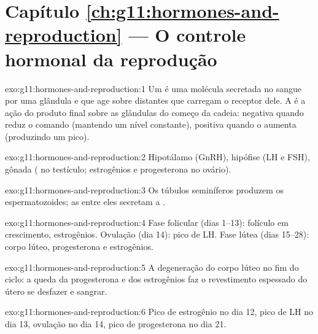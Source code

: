 \section*{Capítulo \ref{ch:g11:hormones-and-reproduction} --- O controle hormonal da reprodução}

\begin{solution}{exo:g11:hormones-and-reproduction:1}
Um  é uma molécula secretada no sangue por uma glândula e que
age sobre  distantes que carregam o receptor dele. A
 é a ação do produto final sobre as glândulas do começo
da cadeia: negativa quando reduz o comando (mantendo um nível
constante), positiva quando o aumenta (produzindo um pico).
\end{solution}

\begin{solution}{exo:g11:hormones-and-reproduction:2}
Hipotálamo (GnRH), hipófise (LH e FSH), gônada ( no
testículo; estrogênios e progesterona no ovário).
\end{solution}

\begin{solution}{exo:g11:hormones-and-reproduction:3}
Os túbulos seminíferos produzem os espermatozoides; as  entre
eles secretam a .
\end{solution}

\begin{solution}{exo:g11:hormones-and-reproduction:4}
Fase folicular (dias 1--13): folículo em crescimento, estrogênios.
Ovulação (dia 14): pico de LH. Fase lútea (dias 15--28): corpo lúteo,
progesterona e estrogênios.
\end{solution}

\begin{solution}{exo:g11:hormones-and-reproduction:5}
A degeneração do corpo lúteo no fim do ciclo: a queda da progesterona e
dos estrogênios faz o revestimento espessado do útero se desfazer e
sangrar.
\end{solution}

\begin{solution}{exo:g11:hormones-and-reproduction:6}
Pico de estrogênio no dia 12, pico de LH no dia 13, ovulação no dia 14,
pico de progesterona no dia 21.
\end{solution}

